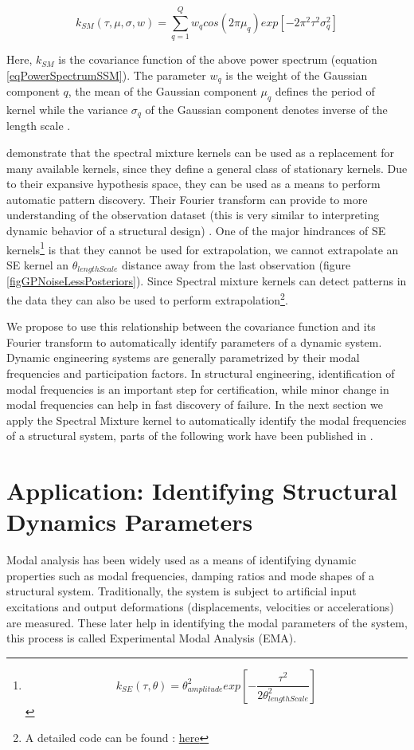 \begin{equation}\label{eqCovarianceKSM}
k_{SM}(\tau, \mu, \sigma, w) = \sum_{q=1}^{Q}w_{q}cos(2\pi\mu_{q}) exp[-2\pi^{2}\tau^{2}\sigma_{q}^2]
\end{equation}

Here, $k_{SM}$ is the covariance function of the above power spectrum (equation \ref{eqPowerSpectrumSSM}). The parameter $w_{q}$ is the weight of the Gaussian component $q$, the mean of the Gaussian component $\mu_{q}$ defines the period of kernel while the variance $\sigma_{q}$ of the Gaussian component denotes inverse of the length scale . 

\cite{wilson2014thesis} demonstrate that the spectral mixture kernels can be used as a replacement for many available kernels, since they define a general class of stationary kernels. Due to their expansive hypothesis space, they can be used as a means to perform automatic pattern discovery. Their Fourier transform can provide to more understanding of the observation dataset (this is very similar to interpreting dynamic behavior of a structural design) \cite{wilson2013gaussian}. One of the major hindrances of SE kernels\footnote{$$k_{SE}(\tau, \theta) = \theta_{amplitude}^2exp \left [-\frac{\tau^2}{2\theta_{lengthScale}^2} \right ]
$$} is that they cannot be used for extrapolation, we cannot extrapolate an SE kernel an $\theta_{lengthScale}$ distance away from the last observation (figure \ref{figGPNoiseLessPosteriors}). Since Spectral mixture kernels can detect patterns in the data they can also be used to perform extrapolation\footnote{A detailed code can be found : \href{https://people.orie.cornell.edu/andrew/code/\#spectral}{here}}. 

We propose to use this relationship between the covariance function and its Fourier transform to automatically identify parameters of a dynamic system. Dynamic engineering systems are generally parametrized by their modal frequencies and participation factors. In structural engineering, identification of modal frequencies is an important step for certification, while minor change in modal frequencies can help in fast discovery of failure. In the next section we apply the Spectral Mixture kernel to automatically identify the modal frequencies of a structural system, parts of the following work have been published in \cite{chiplunkar2017operational}.

\section{Application: Identifying Structural Dynamics Parameters}\label{subSecSMKernelApplication}
Modal analysis has been widely used as a means of identifying dynamic properties such as modal frequencies, damping ratios and mode shapes of a structural system. Traditionally, the system is subject to artificial input excitations and output deformations (displacements, velocities or accelerations) are measured. These later help in identifying the modal parameters of the system, this process is called Experimental Modal Analysis (EMA). 

